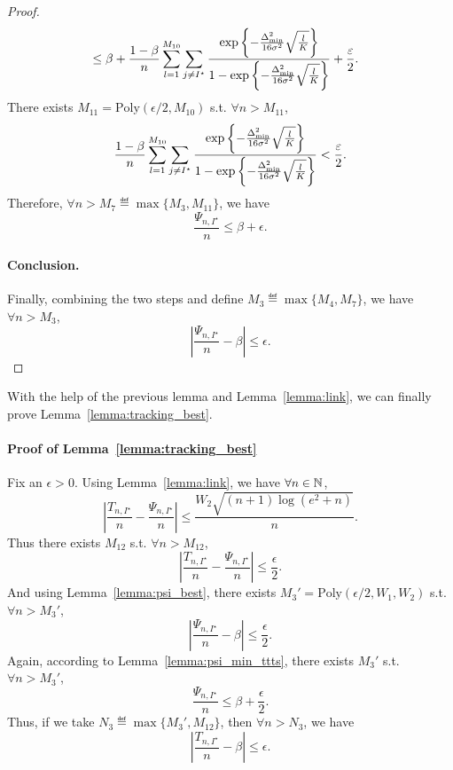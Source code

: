 \begin{proof}
\begin{align*}
                             &\leq \beta + \frac{1-\beta}{n}\sum_{l=1}^{M_{10}}\sum_{j\neq I^\star}\frac{\exp\left\{-\frac{\Delta_{\text{min}}^2}{16\sigma^2}\sqrt{\frac{l}{K}}\right\}}{1-\exp\left\{-\frac{\Delta_{\text{min}}^2}{16\sigma^2}\sqrt{\frac{l}{K}}\right\}} + \frac{\varepsilon}{2}.
    \end{align*}
    There exists $M_{11} = \text{Poly}(\epsilon/2,M_{10})$ s.t. $\forall n > M_{11}$,
    \[
        \frac{1-\beta}{n}\sum_{l=1}^{M_{10}}\sum_{j\neq I^\star}\frac{\exp\left\{-\frac{\Delta_{\text{min}}^2}{16\sigma^2}\sqrt{\frac{l}{K}}\right\}}{1-\exp\left\{-\frac{\Delta_{\text{min}}^2}{16\sigma^2}\sqrt{\frac{l}{K}}\right\}} < \frac{\varepsilon}{2}.
    \]
    Therefore, $\forall n > M_7 \eqdef \max\{M_3,M_{11}\}$, we have
    \[
        \frac{\Psi_{n,I^\star}}{n} \leq \beta + \epsilon.
    \]
    
    \paragraph{Conclusion.} Finally, combining the two steps and define $M_3 \eqdef \max\{M_4,M_7\}$, we have $\forall n > M_3$,
    \[
        \left|\frac{\Psi_{n,I^\star}}{n}-\beta\right| \leq \epsilon.
    \]
\end{proof}

With the help of the previous lemma and Lemma~\ref{lemma:link}, we can finally prove Lemma~\ref{lemma:tracking_best}.

\paragraph{Proof of Lemma~\ref{lemma:tracking_best}}
Fix an $\epsilon > 0$. Using Lemma~\ref{lemma:link}, we have $\forall n\in{\mathbb N}$,
\[
    \left|\frac{T_{n,I^\star}}{n}-\frac{\Psi_{n,I^\star}}{n}\right| \leq \frac{W_2\sqrt{(n+1)\log(e^2+n)}}{n}.
\]
Thus there exists $M_{12}$ s.t. $\forall n > M_{12}$,
\[
    \left|\frac{T_{n,I^\star}}{n}-\frac{\Psi_{n,I^\star}}{n}\right| \leq \frac{\epsilon}{2}.
\]
And using Lemma~\ref{lemma:psi_best}, there exists $M_3' = \text{Poly}(\epsilon/2,W_1,W_2)$ s.t. $\forall n > M_3'$,
\[
    \left|\frac{\Psi_{n,I^\star}}{n}-\beta\right| \leq \frac{\epsilon}{2}.
\]
Again, according to Lemma~\ref{lemma:psi_min_ttts}, there exists $M_3'$ s.t. $\forall n > M_3'$,
\[
    \frac{\Psi_{n,I^\star}}{n} \leq \beta+\frac{\epsilon}{2}.
\]
Thus, if we take $N_3 \eqdef \max\{M_3',M_{12}\}$, then $\forall n > N_3$, we have
\[
    \left| \frac{T_{n,I^\star}}{n}-\beta \right| \leq \epsilon.
\]

\hfill\BlackBox\\[2mm]

